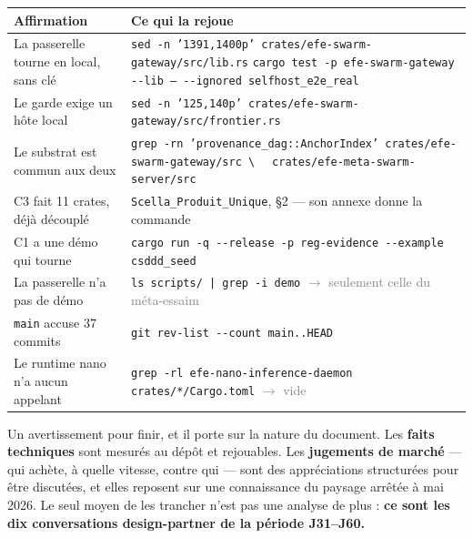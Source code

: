 \documentclass[10pt]{article}
\newcommand{\sz}[1]{\textcolor{grey}{\small\textsf{#1}}}
\newcommand{\code}[1]{\texttt{\small #1}}
\begin{document}
\renewcommand{\arraystretch}{1.22}
\begin{center}\small
\begin{tabular}{@{}>{\raggedright\arraybackslash}p{5.6cm} >{\raggedright\arraybackslash}p{10.4cm}@{}}
\toprule
\textbf{Affirmation} & \textbf{Ce qui la rejoue} \\
\midrule
La passerelle tourne en local, sans clé &
  \code{sed -n '1391,1400p' crates/efe-swarm-gateway/src/lib.rs} \newline
  \code{cargo test -p efe-swarm-gateway -{}-lib -- -{}-ignored selfhost\_e2e\_real} \\
Le garde exige un hôte local &
  \code{sed -n '125,140p' crates/efe-swarm-gateway/src/frontier.rs} \\
Le substrat est commun aux deux &
  \code{grep -rn 'provenance\_dag::AnchorIndex' crates/efe-swarm-gateway/src \textbackslash} \newline
  \code{\ \ crates/efe-meta-swarm-server/src} \\
C3 fait 11 crates, déjà découplé &
  \code{Scella\_Produit\_Unique}, §2 --- son annexe donne la commande \\
C1 a une démo qui tourne &
  \code{cargo run -q -{}-release -p reg-evidence -{}-example csddd\_seed} \\
La passerelle n'a pas de démo &
  \code{ls scripts/ | grep -i demo} \sz{$\rightarrow$ seulement celle du méta-essaim} \\
\code{main} accuse 37 commits &
  \code{git rev-list -{}-count main..HEAD} \\
Le runtime nano n'a aucun appelant &
  \code{grep -rl efe-nano-inference-daemon crates/*/Cargo.toml} \sz{$\rightarrow$ vide} \\
\bottomrule
\end{tabular}
\end{center}

Un avertissement pour finir, et il porte sur la nature du document. Les \textbf{faits techniques} sont
mesurés au dépôt et rejouables. Les \textbf{jugements de marché} --- qui achète, à quelle vitesse,
contre qui --- sont des appréciations structurées pour être discutées, et elles reposent sur une
connaissance du paysage arrêtée à mai 2026. Le seul moyen de les trancher n'est pas une analyse de
plus : \textbf{ce sont les dix conversations design-partner de la période J31--J60.}
\end{document}

